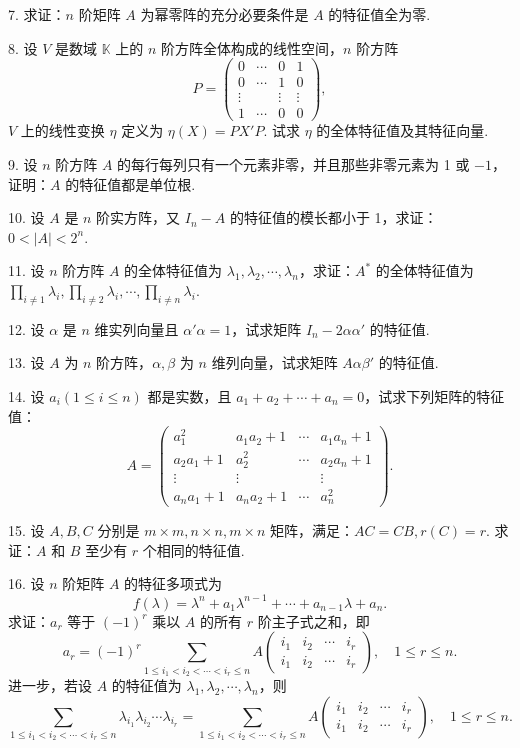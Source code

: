 \documentclass[UTF8,12pt,a4paper,fontset=fandol]{ctexart}
\begin{document}
7. 求证：$n$ 阶矩阵 $A$ 为幂零阵的充分必要条件是 $A$ 的特征值全为零.

8. 设 $V$ 是数域 $\mathbb{K}$ 上的 $n$ 阶方阵全体构成的线性空间，$n$ 阶方阵
\[
P=\left(\begin{array}{cccc}
0 & \cdots & 0 & 1\\
0 & \cdots & 1 & 0\\
\vdots & & \vdots & \vdots\\
1 & \cdots & 0 & 0
\end{array}\right),
\]
$V$ 上的线性变换 $\eta$ 定义为 $\eta(X)=PX'P$. 试求 $\eta$ 的全体特征值及其特征向量.

9. 设 $n$ 阶方阵 $A$ 的每行每列只有一个元素非零，并且那些非零元素为 1 或 $-1$，证明：$A$ 的特征值都是单位根.

10. 设 $A$ 是 $n$ 阶实方阵，又 $I_n-A$ 的特征值的模长都小于 1，求证：$0<|A|<2^n$.

11. 设 $n$ 阶方阵 $A$ 的全体特征值为 $\lambda_1,\lambda_2,\cdots,\lambda_n$，求证：$A^*$ 的全体特征值为 $\prod_{i\neq 1}\lambda_i,\prod_{i\neq 2}\lambda_i,\cdots,\prod_{i\neq n}\lambda_i$.

12. 设 $\alpha$ 是 $n$ 维实列向量且 $\alpha'\alpha=1$，试求矩阵 $I_n-2\alpha\alpha'$ 的特征值.

13. 设 $A$ 为 $n$ 阶方阵，$\alpha,\beta$ 为 $n$ 维列向量，试求矩阵 $A\alpha\beta'$ 的特征值.

14. 设 $a_i(1\leq i\leq n)$ 都是实数，且 $a_1+a_2+\cdots+a_n=0$，试求下列矩阵的特征值：
\[
A=\left(\begin{array}{cccc}
a_1^2 & a_1a_2+1 & \cdots & a_1a_n+1\\
a_2a_1+1 & a_2^2 & \cdots & a_2a_n+1\\
\vdots & \vdots & & \vdots\\
a_na_1+1 & a_na_2+1 & \cdots & a_n^2
\end{array}\right).
\]

15. 设 $A,B,C$ 分别是 $m\times m,n\times n,m\times n$ 矩阵，满足：$AC=CB,r(C)=r$. 求证：$A$ 和 $B$ 至少有 $r$ 个相同的特征值.

16. 设 $n$ 阶矩阵 $A$ 的特征多项式为
\[
f(\lambda)=\lambda^n+a_1\lambda^{n-1}+\cdots+a_{n-1}\lambda+a_n.
\]
求证：$a_r$ 等于 $(-1)^r$ 乘以 $A$ 的所有 $r$ 阶主子式之和，即
\[
a_r=(-1)^r\sum_{1\leq i_1<i_2<\cdots<i_r\leq n}
A\left(\begin{array}{cccc}
i_1 & i_2 & \cdots & i_r\\
i_1 & i_2 & \cdots & i_r
\end{array}\right),\quad 1\leq r\leq n.
\]
进一步，若设 $A$ 的特征值为 $\lambda_1,\lambda_2,\cdots,\lambda_n$，则
\[
\sum_{1\leq i_1<i_2<\cdots<i_r\leq n}\lambda_{i_1}\lambda_{i_2}\cdots\lambda_{i_r}
=
\sum_{1\leq i_1<i_2<\cdots<i_r\leq n}
A\left(\begin{array}{cccc}
i_1 & i_2 & \cdots & i_r\\
i_1 & i_2 & \cdots & i_r
\end{array}\right),\quad 1\leq r\leq n.
\]
\end{document}
